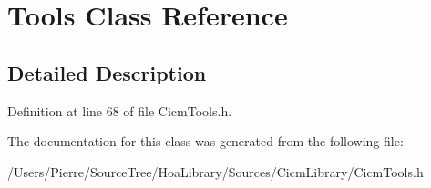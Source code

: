 \hypertarget{class_tools}{\section{Tools Class Reference}
\label{class_tools}
}


\subsection{Detailed Description}


Definition at line 68 of file Cicm\-Tools.\-h.



The documentation for this class was generated from the following file\-:\begin{DoxyCompactItemize}
\item 
/\-Users/\-Pierre/\-Source\-Tree/\-Hoa\-Library/\-Sources/\-Cicm\-Library/Cicm\-Tools.\-h\end{DoxyCompactItemize}
